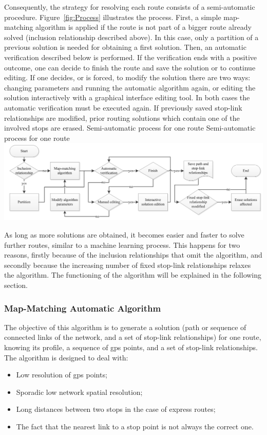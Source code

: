 Consequently, the strategy for resolving each route consists of a semi-automatic procedure. Figure~\ref{fig:Process} illustrates the process. First, a simple map-matching algorithm is applied if the route is not part of a bigger route already solved (inclusion relationship described above). In this case, only a partition of a previous solution is needed for obtaining a first solution. Then, an automatic verification described below is performed. If the verification ends with a positive outcome, one can decide to finish the route and save the solution or to continue editing. If one decides, or is forced, to modify the solution there are two ways: changing parameters and running the automatic algorithm again, or editing the solution interactively with a graphical interface editing tool. In both cases the automatic verification must be executed again. If previously saved stop-link relationships are modified, prior routing solutions which contain one of the involved stops are erased.
%
\createfigure
{Semi-automatic process for one route}
{Semi-automatic process for one route}
{\label{fig:Process}}
{\includegraphics[width=1.0\textwidth]{extending/figures/semiAuto/Process.png}}
{}

As long as more solutions are obtained, it becomes easier and faster to solve further routes, similar to a  machine learning process. This happens for two reasons, firstly because of the inclusion relationships that omit the algorithm, and secondly because the increasing number of fixed stop-link relationships relaxes the algorithm. The functioning of the algorithm will be explained in the following section.

\subsubsection{Map-Matching Automatic Algorithm}
The objective of this algorithm is to generate a solution (path or sequence of connected links of the network, and a set of stop-link relationships) for one route, knowing its profile, a sequence of \gls{gps} points, and a set of stop-link relationships. The algorithm is designed to deal with:
%
\begin{itemize}\styleItemize
\item	Low resolution of \gls{gps} points;
\item	Sporadic low network spatial resolution;
\item	Long distances between two stops in the case of express routes;
\item	The fact that the nearest link to a stop point is not always the correct one.
\end{itemize}

